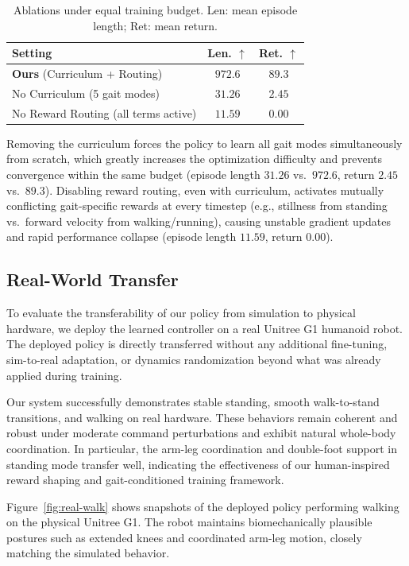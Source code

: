 \documentclass[letterpaper, 10 pt, conference]{ieeeconf}
\renewcommand{\arraystretch}{1.2}
\begin{document}
\begin{table}[h]
\centering
\caption{Ablations under equal training budget. Len: mean episode length; Ret: mean return.}
\label{tab:ablation-core}
\setlength{\tabcolsep}{6pt}
\renewcommand{\arraystretch}{1.05}
\begin{tabular}{lcc}
\toprule
Setting & Len. $\uparrow$ & Ret. $\uparrow$ \\
\midrule
\textbf{Ours} (Curriculum + Routing) & $972.6$ & $89.3$ \\
No Curriculum (5 gait modes)         & $31.26$ & $2.45$ \\
No Reward Routing (all terms active) & $11.59$ & $0.00$ \\
\bottomrule
\end{tabular}
\end{table}

Removing the curriculum forces the policy to learn all gait modes simultaneously from scratch, which greatly increases the optimization difficulty and prevents convergence within the same budget (episode length $31.26$ vs.\ $972.6$, return $2.45$ vs.\ $89.3$).  
Disabling reward routing, even with curriculum, activates mutually conflicting gait-specific rewards at every timestep (e.g., stillness from standing vs.\ forward velocity from walking/running), causing unstable gradient updates and rapid performance collapse (episode length $11.59$, return $0.00$).


\subsection{Real-World Transfer}

To evaluate the transferability of our policy from simulation to physical hardware, we deploy the learned controller on a real Unitree G1 humanoid robot. The deployed policy is directly transferred without any additional fine-tuning, sim-to-real adaptation, or dynamics randomization beyond what was already applied during training.

Our system successfully demonstrates stable standing, smooth walk-to-stand transitions, and  walking on real hardware. These behaviors remain coherent and robust under moderate command perturbations and exhibit natural whole-body coordination. In particular, the arm-leg coordination and double-foot support in standing mode transfer well, indicating the effectiveness of our human-inspired reward shaping and gait-conditioned training framework.

Figure~\ref{fig:real-walk} shows snapshots of the deployed policy performing walking on the physical Unitree G1. The robot maintains biomechanically plausible postures such as extended knees and coordinated arm-leg motion, closely matching the simulated behavior.
\end{document}

